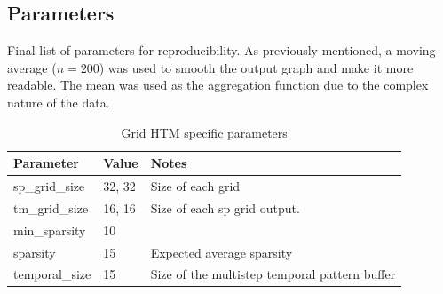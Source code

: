 \subsection{Parameters}
Final list of parameters for reproducibility. As previously mentioned, a moving average ($n=200$) was used to smooth the output graph and make it more readable. The mean was used as the aggregation function due to the complex nature of the data.
\begin{table}[H]
    \centering
    \begin{tabularx}{\linewidth}{@{}XlX@{}}
        \toprule
        \textbf{Parameter} & \textbf{Value} & \textbf{Notes}                                \\
        \midrule
        sp\_grid\_size     & 32, 32         & Size of each grid                             \\
        tm\_grid\_size     & 16, 16         & Size of each \gls*{sp} grid output.           \\
        min\_sparsity      & 10             &                                               \\
        sparsity           & 15             & Expected average sparsity                     \\
        temporal\_size     & 15             & Size of the multistep temporal pattern buffer \\
        \bottomrule
    \end{tabularx}
    \caption{Grid HTM specific parameters}
    \label{tab:surveillance_grid_htm}
\end{table}
